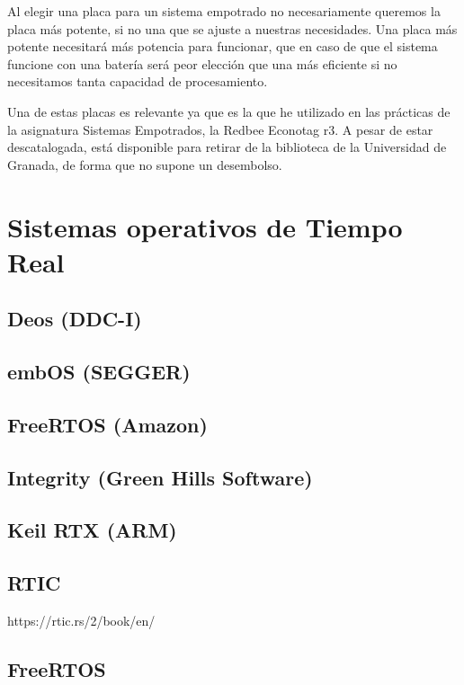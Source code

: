Al elegir una placa para un sistema empotrado no necesariamente queremos la placa más potente, si no una que se ajuste a nuestras necesidades. Una placa más potente necesitará más potencia para funcionar, que en caso de que el sistema funcione con una batería será peor elección que una más eficiente si no necesitamos tanta capacidad de procesamiento.

Una de estas placas es relevante ya que es la que he utilizado en las prácticas de la asignatura Sistemas Empotrados, la Redbee Econotag r3. A pesar de estar descatalogada, está disponible para retirar de la biblioteca de la Universidad de Granada, de forma que no supone un desembolso.

\section{Sistemas operativos de Tiempo Real}
\subsection{Deos (DDC-I)}
\subsection{embOS (SEGGER)}
\subsection{FreeRTOS (Amazon)}
\subsection{Integrity (Green Hills Software)}
\subsection{Keil RTX (ARM)}
\subsection{RTIC}
https://rtic.rs/2/book/en/
\subsection{FreeRTOS}


